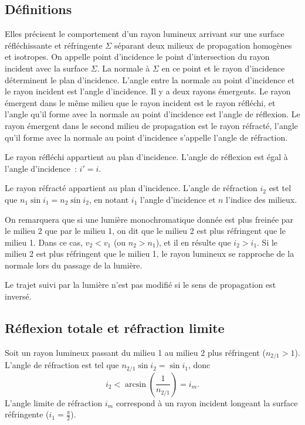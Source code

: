 \subsection{Définitions}\label{chap6-subsec:définitions}%
%
Elles précisent le comportement d'un rayon lumineux arrivant sur une surface 
réfléchissante et réfringente \(\Sigma\) séparant deux milieux de propagation 
homogènes et isotropes. On appelle point d'incidence le point d'intersection du 
rayon incident avec la surface \(\Sigma\). La normale à \(\Sigma\) en ce point 
et le rayon d'incidence déterminent le plan d'incidence. L'angle entre la 
normale au point d'incidence et le rayon incident est l'angle d'incidence. Il y 
a deux rayons émergents. Le rayon émergent dans le même milieu que le rayon 
incident est le rayon réfléchi, et l'angle qu'il forme avec la normale au point 
d'incidence est l'angle de réflexion. Le rayon émergent dans le second milieu 
de propagation est le rayon réfracté, l'angle qu'il forme avec la normale au 
point d'incidence s'appelle l'angle de réfraction.
%
\begin{theo}%
  Le rayon réfléchi appartient au plan d'incidence. L'angle de réflexion est 
  égal à l'angle d'incidence~: \(i'=i\).
\end{theo}%
\begin{theo}%
  Le rayon réfracté appartient au plan d'incidence. L'angle de réfraction 
  \(i_2\) est tel que \(n_1 \sin i_1 = n_2 \sin i_2\), en notant \(i_1\) 
  l'angle d'incidence et \(n\) l'indice des milieux.
\end{theo}%
%
On remarquera que si une lumière monochromatique donnée est plus freinée par le 
milieu 2 que par le milieu 1, on dit que le milieu 2 est plus réfringent que le 
milieu 1. Dans ce cas, \(v_2 < v_1\) (ou \(n_2 > n_1\)), et il en résulte que 
\(i_2 > i_1\). Si le milieu 2 est plus réfringent que le milieu 1, le rayon 
lumineux se rapproche de la normale lors du passage de la lumière.
%
\begin{theo}%
  Le trajet suivi par la lumière n'est pas modifié si le sens de propagation 
  est inversé.
\end{theo}%
%
\subsection{Réflexion totale et réfraction 
limite}\label{chap6-subsec:reftotale}%
%
Soit un rayon lumineux passant du milieu 1 au milieu 2 plus réfringent 
(\(n_{2/1}>1\)). L'angle de réfraction est tel que \(n_{2/1} \sin i_2 = \sin 
i_1\), donc
\begin{equation}%
  i_2 < \arcsin \left(\frac{1}{n_{2/1}} \right) = i_m.
\end{equation}%
L'angle limite de réfraction \(i_m\) correspond à un rayon incident longeant la 
surface réfringente (\(i_1 = \frac{\pi}{2}\)).

